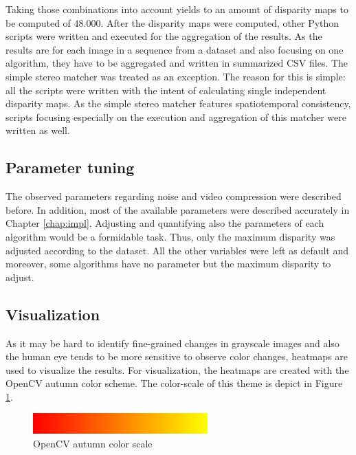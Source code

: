\newline\newline\noindent Taking those combinations into account yields to an amount of disparity maps to be computed of $48.000$.
After the disparity maps were computed, other Python scripts were written and executed for the aggregation of the results.
As the results are for each image in a sequence from a dataset and also focusing on one algorithm, they have to be aggregated and written in summarized CSV files.
The simple stereo matcher was treated as an exception.
The reason for this is simple: all the scripts were written with the intent of calculating single independent disparity maps.
As the simple stereo matcher features spatiotemporal consistency, scripts focusing especially on the execution and aggregation of this matcher were written as well.

\subsection*{Parameter tuning}

The observed parameters regarding noise and video compression were described before.
In addition, most of the available parameters were described accurately in Chapter \ref{chap:impl}.
Adjusting and quantifying also the parameters of each algorithm would be a formidable task.
Thus, only the maximum disparity was adjusted according to the dataset.
All the other variables were left as default and moreover, some algorithms have no parameter but the maximum disparity to adjust.

\subsection*{Visualization}

As it may be hard to identify fine-grained changes in grayscale images and also the human eye tends to be more sensitive to observe color changes, heatmaps are used to visualize the results.
For visualization, the heatmaps are created with the OpenCV autumn color scheme.
The color-scale of this theme is depict in Figure \ref{fig:colorscale}.

\begin{figure}[h!]
  \centering
  \includegraphics[width=0.6\textwidth]{src/images/colorscale.png}
  \caption[OpenCV autumn color scale]{OpenCV autumn color scale\protect\footnotemark}
  \label{fig:colorscale}
\end{figure}


